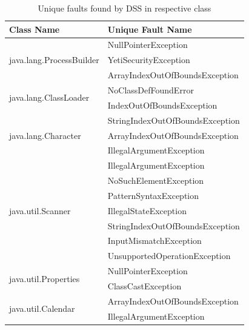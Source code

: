 \documentclass[conference]{IEEEtran}
\begin{document}
\begin{table}[H]
\small
\caption{Unique faults found by DSS in respective class} %
\centering %
\begin{tabular}{| l | l |} %
\hline\hline %
Class Name & Unique Fault Name \\ [0.5ex] %
\hline %
\multirow{3}{*}{java.lang.ProcessBuilder} & NullPointerException\\ %
& YetiSecurityException\\ %
& ArrayIndexOutOfBoundsException\\ %
\hline
\multirow{2}{*}{java.lang.ClassLoader} & NoClassDefFoundError\\ %
& IndexOutOfBoundsException\\ %
\hline
\multirow{3}{*}{java.lang.Character} & StringIndexOutOfBoundsException\\ %
& ArrayIndexOutOfBoundsException\\ %
& IllegalArgumentException\\ %
\hline
\multirow{7}{*}{java.util.Scanner} & IllegalArgumentException\\ %
& NoSuchElementException\\ %
& PatternSyntaxException\\ %
& IllegalStateException\\ %
& StringIndexOutOfBoundsException\\ %
& InputMismatchException\\ %
& UnsupportedOperationException\\ %
\hline
\multirow{2}{*}{java.util.Properties} & NullPointerException\\ %
& ClassCastException\\ %
\hline
\multirow{2}{*}{java.util.Calendar} & ArrayIndexOutOfBoundsException\\ %
& IllegalArgumentException\\ %

\end{tabular}
\end{table}
\end{document}
